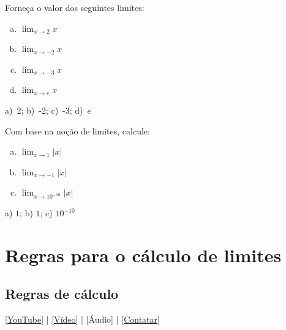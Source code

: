 \begin{exer}
  Forneça o valor dos seguintes limites:
  \begin{enumerate}[a)]
  \item $\displaystyle \lim_{x\to 2} x$
  \item $\displaystyle \lim_{x\to -2} x$
  \item $\displaystyle \lim_{x\to -3} x$
  \item $\displaystyle \lim_{x\to e} x$
  \end{enumerate}
\end{exer}
\begin{resp}
  a)~2; b)~-2; c)~-3; d)~$e$
\end{resp}

\begin{exer}
  Com base na noção de limites, calcule:
  \begin{enumerate}[a)]
  \item $\displaystyle\lim_{x\to 1} |x|$
  \item $\displaystyle\lim_{x\to -1} |x|$
  \item $\displaystyle\lim_{x\to 10^{-10}} |x|$
  \end{enumerate}
\end{exer}
\begin{resp}
  a) $1$; b) $1$; c) $10^{-10}$
\end{resp}

\section{Regras para o cálculo de limites}\label{cap_lim_sec_regras}

\subsection{Regras de cálculo}

\begin{flushright}
  \href{https://youtu.be/chAoC7xoeYM}{[YouTube]} | \href{https://archive.org/details/video_20220629_1213}{[Vídeo]} | [Áudio] | \href{https://phkonzen.github.io/notas/contato.html}{[Contatar]}
\end{flushright}

